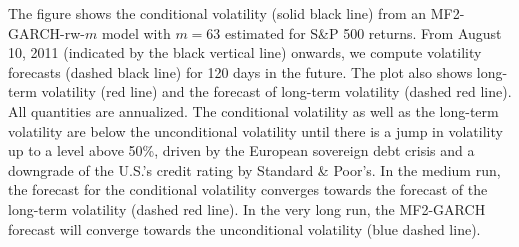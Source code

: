 \documentclass[11pt,noindent]{article}
\newcommand{\1}{\mbox{$\mathrm{1\hspace*{-2.5pt}l}$\,}}   %
\begin{document}
The figure shows the conditional volatility (solid black line) from an MF2-GARCH-rw-$m$ model with $m = 63$ estimated for S\&P 500 returns. From August 10, 2011 (indicated by the black vertical line) onwards, we compute volatility forecasts (dashed black line) for 120 days in the future. The plot also shows long-term volatility (red line) and the forecast of long-term volatility (dashed red line). All quantities are annualized. The conditional volatility as well as the long-term volatility are below the unconditional volatility until there is a jump in volatility up to a level above 50\%, driven by the European sovereign debt crisis and a downgrade of the U.S.’s credit rating by Standard \& Poor’s. In the medium run, the forecast for the conditional volatility converges towards the forecast of the long-term volatility (dashed red line). In the very long run, the MF2-GARCH forecast will converge towards the unconditional volatility (blue dashed line). 




\small


\end{document}
